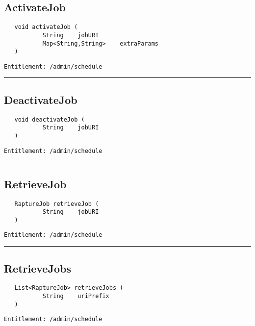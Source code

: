 \subsection{ActivateJob}
\label{Api:ActivateJob}
\begin{Verbatim}
   void activateJob (
           String    jobURI
           Map<String,String>    extraParams
   )
\end{Verbatim}
\begin{Verbatim}[formatcom=\color{Maroon}]
  Entitlement: /admin/schedule
\end{Verbatim}



\rule{12cm}{2pt}
\subsection{DeactivateJob}
\label{Api:DeactivateJob}
\begin{Verbatim}
   void deactivateJob (
           String    jobURI
   )
\end{Verbatim}
\begin{Verbatim}[formatcom=\color{Maroon}]
  Entitlement: /admin/schedule
\end{Verbatim}



\rule{12cm}{2pt}
\subsection{RetrieveJob}
\label{Api:RetrieveJob}
\begin{Verbatim}
   RaptureJob retrieveJob (
           String    jobURI
   )
\end{Verbatim}
\begin{Verbatim}[formatcom=\color{Maroon}]
  Entitlement: /admin/schedule
\end{Verbatim}



\rule{12cm}{2pt}
\subsection{RetrieveJobs}
\label{Api:RetrieveJobs}
\begin{Verbatim}
   List<RaptureJob> retrieveJobs (
           String    uriPrefix
   )
\end{Verbatim}
\begin{Verbatim}[formatcom=\color{Maroon}]
  Entitlement: /admin/schedule
\end{Verbatim}




